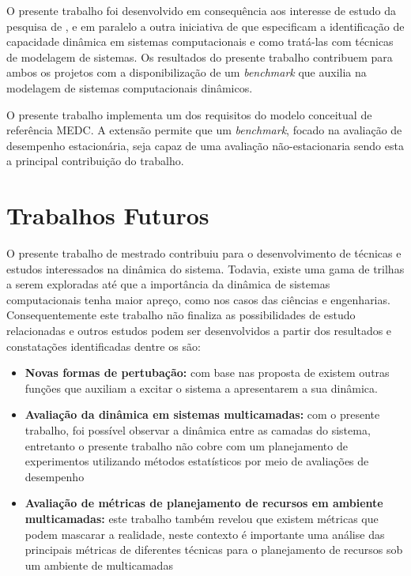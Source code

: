 O presente trabalho foi desenvolvido em consequência aos interesse de estudo da pesquisa de , e em paralelo a outra iniciativa de  que especificam a identificação de capacidade dinâmica em sistemas computacionais e como tratá-las com técnicas de modelagem de sistemas. Os resultados do presente trabalho contribuem para ambos os projetos com a disponibilização de um \textit{benchmark} que auxilia na modelagem de sistemas computacionais dinâmicos.

O presente trabalho implementa um dos requisitos do modelo conceitual de referência MEDC. A extensão permite que um \textit{benchmark}, focado na avaliação de desempenho estacionária, seja capaz de uma avaliação não-estacionaria sendo esta a principal contribuição do trabalho.

\section{Trabalhos Futuros}
O presente trabalho de mestrado contribuiu para o desenvolvimento de técnicas e estudos interessados na dinâmica do sistema. Todavia, existe uma gama de trilhas a serem exploradas até que a importância da dinâmica de sistemas computacionais tenha maior apreço, como nos casos das ciências e engenharias. Consequentemente este trabalho não finaliza as possibilidades de estudo relacionadas e outros estudos podem ser desenvolvidos a partir dos resultados e constatações identificadas dentre os são:
\begin{itemize}
	\item \textbf{Novas formas de pertubação:} com base nas proposta de \cite{Hellerstein2004} existem outras funções que auxiliam a excitar o sistema a apresentarem a sua dinâmica. 
	
	\item \textbf{Avaliação da dinâmica em sistemas multicamadas:} com o presente trabalho, foi possível observar a dinâmica entre as camadas do sistema, entretanto o presente trabalho não cobre com um planejamento de experimentos utilizando métodos estatísticos por meio de avaliações de desempenho
	
	\item \textbf{Avaliação de métricas de planejamento de recursos em ambiente multicamadas:} este trabalho também revelou que existem métricas que podem mascarar a realidade, neste contexto é importante uma análise das principais métricas de diferentes técnicas para o planejamento de recursos sob um ambiente de multicamadas
\end{itemize} 	
